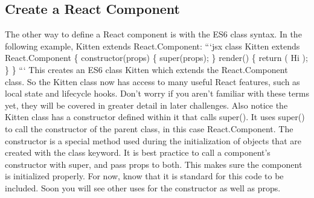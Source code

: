 \documentclass{article}%
\begin{document}
\subsection{Create a React Component}%
\label{subsec:CreateaReactComponent}%
The other way to define a React component is with the ES6 class syntax. In the following example, Kitten extends React.Component:\newline%
```jsx\newline%
class Kitten extends React.Component \{\newline%
  constructor(props) \{\newline%
    super(props);\newline%
  \}\newline%
  render() \{\newline%
    return (\newline%
      Hi\newline%
    );\newline%
  \}\newline%
\}\newline%
```\newline%
This creates an ES6 class Kitten which extends the React.Component class. So the Kitten class now has access to many useful React features, such as local state and lifecycle hooks. Don't worry if you aren't familiar with these terms yet, they will be covered in greater detail in later challenges.\newline%
Also notice the Kitten class has a constructor defined within it that calls super(). It uses super() to call the constructor of the parent class, in this case React.Component. The constructor is a special method used during the initialization of objects that are created with the class keyword. It is best practice to call a component's constructor with super, and pass props to both. This makes sure the component is initialized properly. For now, know that it is standard for this code to be included. Soon you will see other uses for the constructor as well as props.\newline%

%
\end{document}

